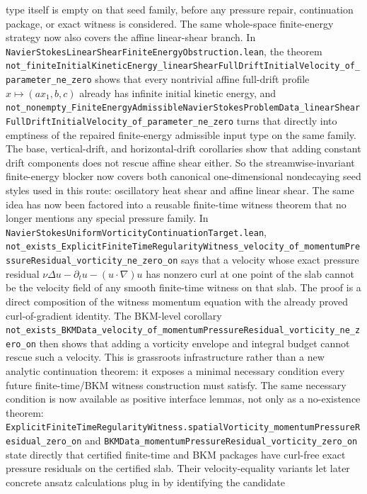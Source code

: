 \documentclass[11pt]{article}
\theoremstyle{remark}
\begin{document}
type itself is empty on that seed family, before any pressure repair,
continuation package, or exact witness is considered.
The same whole-space finite-energy strategy now also covers the affine
linear-shear branch.  In
\texttt{NavierStokesLinearShearFiniteEnergyObstruction.lean}, the theorem
\texttt{not\_finiteInitialKineticEnergy\_linearShearFullDriftInitialVelocity\_of\_parameter\_ne\_zero}
shows that every nontrivial affine full-drift profile
\(x \mapsto (a x_1,b,c)\) already has infinite initial kinetic energy, and
\texttt{not\_nonempty\_FiniteEnergyAdmissibleNavierStokesProblemData\_linearShearFullDriftInitialVelocity\_of\_parameter\_ne\_zero}
turns that directly into emptiness of the repaired finite-energy admissible
input type on the same family.  The base, vertical-drift, and
horizontal-drift corollaries show that adding constant drift components does
not rescue affine shear either.  So the streamwise-invariant finite-energy
blocker now covers both canonical one-dimensional nondecaying seed styles used
in this route: oscillatory heat shear and affine linear shear.
The same idea has now been factored into a reusable finite-time witness theorem
that no longer mentions any special pressure family.  In
\texttt{NavierStokesUniformVorticityContinuationTarget.lean},
\texttt{not\_exists\_ExplicitFiniteTimeRegularityWitness\_velocity\_of\_momentumPressureResidual\_vorticity\_ne\_zero\_on}
says that a velocity whose exact pressure residual
\(\nu\Delta u-\partial_tu-(u\cdot\nabla)u\) has nonzero curl at one point of the
slab cannot be the velocity field of any smooth finite-time witness on that
slab.  The proof is a direct composition of the witness momentum equation with
the already proved curl-of-gradient identity.  The BKM-level corollary
\texttt{not\_exists\_BKMData\_velocity\_of\_momentumPressureResidual\_vorticity\_ne\_zero\_on}
then shows that adding a vorticity envelope and integral budget cannot rescue
such a velocity.  This is grassroots infrastructure rather than a new analytic
continuation theorem: it exposes a minimal necessary condition every future
finite-time/BKM witness construction must satisfy.
The same necessary condition is now available as positive interface lemmas,
not only as a no-existence theorem:
\texttt{ExplicitFiniteTimeRegularityWitness.spatialVorticity\_momentumPressureResidual\_zero\_on}
and
\texttt{BKMData\_momentumPressureResidual\_vorticity\_zero\_on}
state directly that certified finite-time and BKM packages have curl-free exact
pressure residuals on the certified slab.  Their velocity-equality variants
let later concrete ansatz calculations plug in by identifying the candidate
\end{document}
